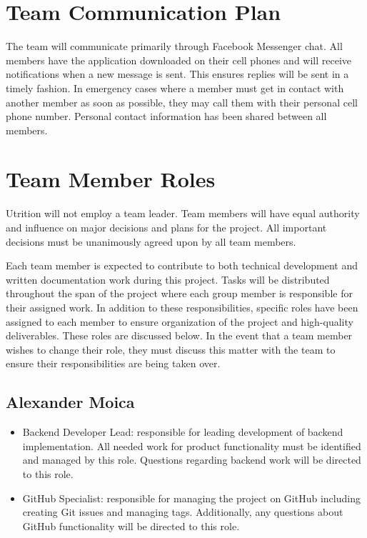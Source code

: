 \documentclass{article}
\begin{document}
\section{Team Communication Plan}

The team will communicate primarily through Facebook Messenger chat. All members have the application downloaded on their cell phones and will receive notifications when a new message is sent. This ensures replies will be sent in a timely fashion. In emergency cases where a member must get in contact with another member as soon as possible, they may call them with their personal cell phone number. Personal contact information has been shared between all members.

\section{Team Member Roles}

Utrition will not employ a team leader. Team members will have equal authority and influence on major decisions and plans for the project. All important decisions must be unanimously agreed upon by all team members.

Each team member is expected to contribute to both technical development and written documentation work during this project. Tasks will be distributed throughout the span of the project where each group member is responsible for their assigned work. In addition to these responsibilities, specific roles have been assigned to each member to ensure organization of the project and high-quality deliverables. These roles are discussed below. In the event that a team member wishes to change their role, they must discuss this matter with the team to ensure their responsibilities are being taken over.

\subsection{Alexander Moica}

\begin{itemize}
	\item Backend Developer Lead: responsible for leading development of backend implementation. All needed work for product functionality must be identified and managed by this role. Questions regarding backend work will be directed to this role.
	\item GitHub Specialist: responsible for managing the project on GitHub including creating Git issues and managing tags. Additionally, any questions about GitHub functionality will be directed to this role.
\end{itemize}
\end{document}
